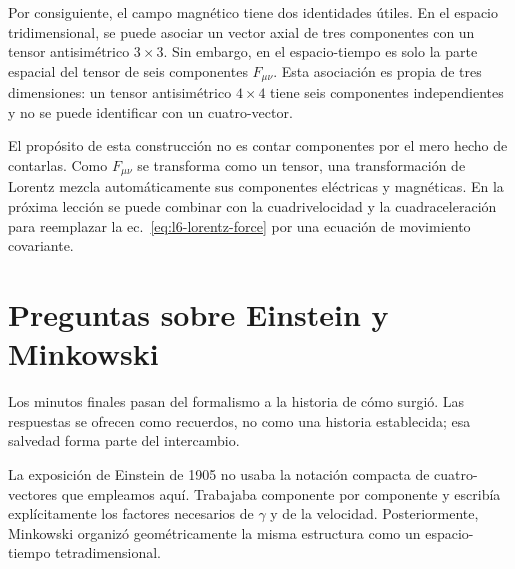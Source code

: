 Por consiguiente, el campo magnético tiene dos identidades útiles. En el espacio tridimensional, se puede asociar un vector axial de tres componentes con un tensor antisimétrico \(3\times3\). Sin embargo, en el espacio-tiempo es solo la parte espacial del tensor de seis componentes \(F_{\mu\nu}\). Esta asociación es propia de tres dimensiones: un tensor antisimétrico \(4\times4\) tiene seis componentes independientes y no se puede identificar con un cuatro-vector.

El propósito de esta construcción no es contar componentes por el mero hecho de contarlas. Como \(F_{\mu\nu}\) se transforma como un tensor, una transformación de Lorentz mezcla automáticamente sus componentes eléctricas y magnéticas. En la próxima lección se puede combinar con la cuadrivelocidad y la cuadraceleración para reemplazar la ec.~\eqref{eq:l6-lorentz-force} por una ecuación de movimiento covariante.

\section{Preguntas sobre Einstein y Minkowski}

Los minutos finales pasan del formalismo a la historia de cómo surgió. Las respuestas se ofrecen como recuerdos, no como una historia establecida; esa salvedad forma parte del intercambio.

\begin{classroomqa}\end{classroomqa}

La exposición de Einstein de 1905 no usaba la notación compacta de cuatro-vectores que empleamos aquí. Trabajaba componente por componente y escribía explícitamente los factores necesarios de \(\gamma\) y de la velocidad. Posteriormente, Minkowski organizó geométricamente la misma estructura como un espacio-tiempo tetradimensional.

